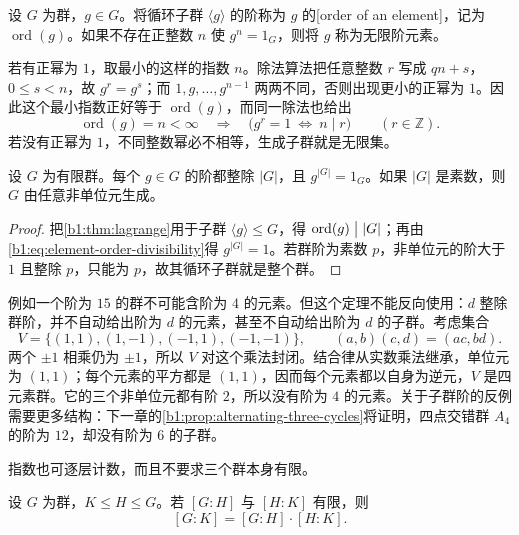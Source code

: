 \begin{definition}\label{b1:def:element-order}
	设 \(G\) 为群，\(g\in G\)。将循环子群 \(\langle g\rangle\) 的阶称为 \(g\) 的[order of an element]，记为 \(\operatorname{ord}(g)\)。如果不存在正整数 \(n\) 使 \(g^n=1_G\)，则将 \(g\) 称为无限阶元素。
\end{definition}


若有正幂为 \(1\)，取最小的这样的指数 \(n\)。除法算法把任意整数 \(r\) 写成 \(qn+s\)，\(0\leq s<n\)，故 \(g^r=g^s\)；而 \(1,g,\ldots,g^{n-1}\) 两两不同，否则出现更小的正幂为 \(1\)。因此这个最小指数正好等于 \(\operatorname{ord}(g)\)，而同一除法也给出
\begin{equation}\label{b1:eq:element-order-divisibility}
	\operatorname{ord}(g)=n<\infty \quad\Longrightarrow\quad \bigl(g^r=1\ \Longleftrightarrow\ n\mid r\bigr) \qquad(r\in\mathbb Z).
\end{equation}
若没有正幂为 \(1\)，不同整数幂必不相等，生成子群就是无限集。

\begin{corollary}\label{b1:cor:finite-order-divides}
	设 \(G\) 为有限群。每个 \(g\in G\) 的阶都整除 \(|G|\)，且 \(g^{|G|}=1_G\)。如果 \(|G|\) 是素数，则 \(G\) 由任意非单位元生成。
\end{corollary}

\begin{proof}
	把\cref{b1:thm:lagrange}用于子群 \(\langle g\rangle\leq G\)，得 \(\operatorname{ord}(g)\bigm\vert\lvert G\rvert\)；再由\eqref{b1:eq:element-order-divisibility}得 \(g^{\lvert G\rvert}=1\)。若群阶为素数 \(p\)，非单位元的阶大于 \(1\) 且整除 \(p\)，只能为 \(p\)，故其循环子群就是整个群。
\end{proof}

例如一个阶为 \(15\) 的群不可能含阶为 \(4\) 的元素。但这个定理不能反向使用：\(d\) 整除群阶，并不自动给出阶为 \(d\) 的元素，甚至不自动给出阶为 \(d\) 的子群。考虑集合
\[
	V=\{(1,1),(1,-1),(-1,1),(-1,-1)\}, \qquad (a,b)(c,d)=(ac,bd).
\]
两个 \(\pm1\) 相乘仍为 \(\pm1\)，所以 \(V\) 对这个乘法封闭。结合律从实数乘法继承，单位元为 \((1,1)\)；每个元素的平方都是 \((1,1)\)，因而每个元素都以自身为逆元，\(V\) 是四元素群。它的三个非单位元都有阶 \(2\)，所以没有阶为 \(4\) 的元素。关于子群阶的反例需要更多结构：下一章的\cref{b1:prop:alternating-three-cycles}将证明，四点交错群 \(A_4\) 的阶为 \(12\)，却没有阶为 \(6\) 的子群。

\ProseParagraphBreak
指数也可逐层计数，而且不要求三个群本身有限。
\begin{proposition}[指数的乘法公式]\label{b1:prop:index-multiplication}
	设 \(G\) 为群，\(K\leq H\leq G\)。若 \([G:H]\) 与 \([H:K]\) 有限，则
	\[
		[G:K]=[G:H]\cdot [H:K].
	\]
\end{proposition}

